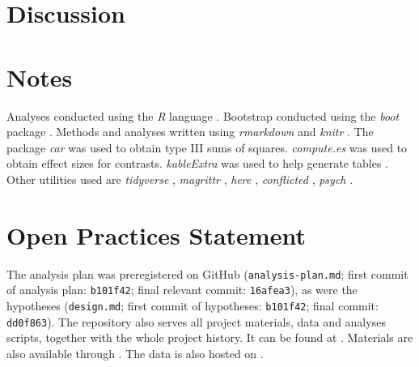 \documentclass[12pt]{article}
\newcommand\specialsection{%
    \titleformat{\section}{\centering\normalsize\rmfamily}{}{0pt}{}
}
\begin{document}


\hypertarget{discussion}{%
\section{Discussion}}



\specialsection

\section{Notes}

Analyses conducted using the \textit{R} language
\citep{rcoreteamLanguageEnvironmentStatistical2019}.
Bootstrap conducted using the \textit{boot} package
\citep{cantyBootBootstrapSPlus2017}. Methods and analyses written using
\textit{rmarkdown} \citep{allaireRmarkdownDynamicDocuments2019} and
\textit{knitr} \citep{xieKnitrGeneralPurposePackage2019}. The package
\textit{car} \citep{foxCompanionAppliedRegression2011} was used to
obtain type III sums of squares. \textit{compute.es}
\citep{reComputeEsCompute2013} was used to obtain effect sizes for
contrasts. \textit{kableExtra} was used to help generate tables
\citep{zhuKableExtraConstructComplex2019}. Other utilities used are
\textit{tidyverse} \citep{wickhamTidyverseEasilyInstall2017},
\textit{magrittr} \citep{bacheMagrittrForwardPipeOperator2014},
\textit{here} \citep{mullerHereSimplerWay2017}, \textit{conflicted}
\citep{wickhamConflictedAlternativeConflict2018}, \textit{psych}
\citep{revellePsychProceduresPsychological2018}.

\section{Open Practices Statement}

The analysis plan was preregistered on GitHub (\texttt{analysis-plan.md};
first commit of analysis plan: \texttt{b101f42}; final relevant commit:
\texttt{16afea3}), as were the hypotheses (\texttt{design.md}; first commit of hypotheses:
\texttt{b101f42}; final commit: \texttt{dd0f863}).  The repository also serves all
project materials, data and analyses scripts, together with the whole project
history. It can be found at
.
Materials are also available through . The data
is also hosted on
.
\end{document}
